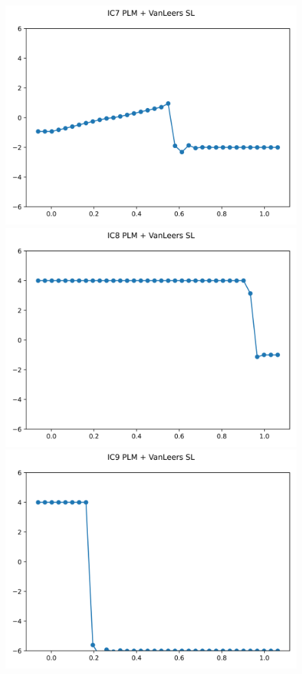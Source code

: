 \documentclass{article}
\begin{document}
\begin{figure}[t]
    \emp
        \centering
        \includegraphics[width=.95\textwidth]{../../code/IC7Methodpv_plot.png}
        \includegraphics[width=.95\textwidth]{../../code/IC8Methodpv_plot.png}
        \includegraphics[width=.95\textwidth]{../../code/IC9Methodpv_plot.png}

\end{figure}
\end{document}
